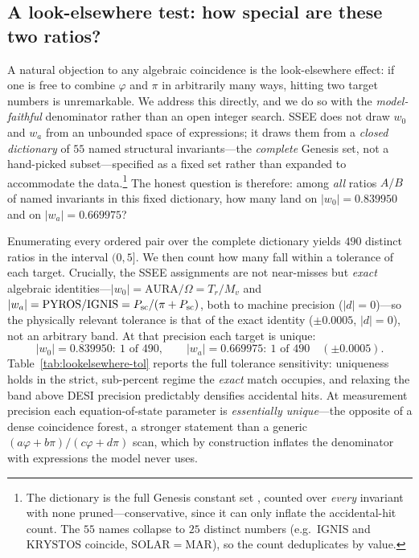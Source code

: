 \documentclass[aps,prd,preprint,amsmath,amssymb,nofootinbib,longbibliography]{revtex4-2}
\begin{document}
\subsection{A look-elsewhere test: how special are these two ratios?}
\label{sec:look-elsewhere}
A natural objection to any algebraic coincidence is the look-elsewhere
effect: if one is free to combine $\varphi$ and $\pi$ in arbitrarily many
ways, hitting two target numbers is unremarkable. We address this directly,
and we do so with the \emph{model-faithful} denominator rather than an open
integer search. SSEE does not draw $w_0$ and $w_a$ from an unbounded space of
expressions; it draws them from a \emph{closed dictionary} of
$55$ named structural invariants---the \emph{complete} Genesis set,
not a hand-picked subset---specified as a fixed set rather than expanded to
accommodate the data.\footnote{The dictionary is the full Genesis constant
set \citep{AlmeidaSSEE2026genesis}, counted over \emph{every} invariant with
none pruned---conservative, since it can only inflate the accidental-hit count.
The $55$ names collapse to $25$ distinct numbers (e.g.\ $\mathrm{IGNIS}$ and
$\mathrm{KRYSTOS}$ coincide, $\mathrm{SOLAR}=\mathrm{MAR}$), so the count
deduplicates by value.} The honest question is therefore: among
\emph{all} ratios $A/B$ of named invariants in this fixed dictionary, how many
land on $|w_0|=0.839950$ and on $|w_a|=0.669975$?

Enumerating every ordered pair over the complete dictionary yields $490$ distinct
ratios in the interval $(0,5]$. We then count how many fall within a tolerance of
each target. Crucially, the SSEE assignments are not near-misses but \emph{exact}
algebraic identities---$|w_0|=\mathrm{AURA}/\Omega=T_r/M_v$ and
$|w_a|=\mathrm{PYROS}/\mathrm{IGNIS}=P_{\rm sc}/(\pi+P_{\rm sc})$, both to machine precision
($|d|=0$)---so the physically relevant tolerance is that of the exact identity
($\pm0.0005$, $|d|=0$), not an arbitrary band. At that precision each target is
unique:
\begin{equation}
  |w_0|=0.839950:\ \text{1 of 490},\qquad
  |w_a|=0.669975:\ \text{1 of 490}\quad(\pm0.0005).
  \label{eq:lookelsewhere}
\end{equation}
Table~\ref{tab:lookelsewhere-tol} reports the full tolerance sensitivity:
uniqueness holds in the strict, sub-percent regime the \emph{exact} match
occupies, and relaxing the band above DESI precision predictably densifies
accidental hits. At measurement precision each equation-of-state parameter
is \emph{essentially unique}---the opposite of a dense coincidence forest, a
stronger statement than a generic $(a\varphi+b\pi)/(c\varphi+d\pi)$ scan, which
by construction inflates the denominator with expressions the model never uses.
\end{document}

